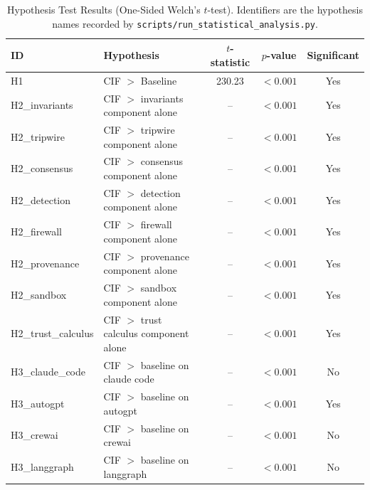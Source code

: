 \begin{table}[htbp]
\centering
\caption{Hypothesis Test Results (One-Sided Welch's $t$-test). Identifiers are the hypothesis names recorded by \texttt{scripts/run\_statistical\_analysis.py}.}
\label{tab:hypothesis-tests}
\begin{tabular}{llccc}
\toprule
ID & Hypothesis & $t$-statistic & $p$-value & Significant \\
\midrule
H1 & CIF $>$ Baseline & 230.23 & $< 0.001$ & Yes \\
H2\_invariants & CIF $>$ invariants component alone & -- & $< 0.001$ & Yes \\
H2\_tripwire & CIF $>$ tripwire component alone & -- & $< 0.001$ & Yes \\
H2\_consensus & CIF $>$ consensus component alone & -- & $< 0.001$ & Yes \\
H2\_detection & CIF $>$ detection component alone & -- & $< 0.001$ & Yes \\
H2\_firewall & CIF $>$ firewall component alone & -- & $< 0.001$ & Yes \\
H2\_provenance & CIF $>$ provenance component alone & -- & $< 0.001$ & Yes \\
H2\_sandbox & CIF $>$ sandbox component alone & -- & $< 0.001$ & Yes \\
H2\_trust\_calculus & CIF $>$ trust calculus component alone & -- & $< 0.001$ & Yes \\
H3\_claude\_code & CIF $>$ baseline on claude code & -- & $< 0.001$ & No \\
H3\_autogpt & CIF $>$ baseline on autogpt & -- & $< 0.001$ & Yes \\
H3\_crewai & CIF $>$ baseline on crewai & -- & $< 0.001$ & No \\
H3\_langgraph & CIF $>$ baseline on langgraph & -- & $< 0.001$ & No \\
\bottomrule
\end{tabular}
\end{table}